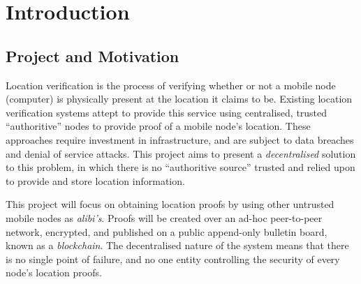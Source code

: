 \section{Introduction}
\subsection{Project and Motivation}
Location verification is the process of verifying whether or not a mobile node (computer) is physically present at the location it claims to be. Existing location verification systems attept to provide this service using centralised, trusted ``authoritive'' nodes to provide proof of a mobile node's location. These approaches require investment in infrastructure, and are subject to data breaches and denial of service attacks. This project aims to present a \textit{decentralised} solution to this problem, in which there is no ``authoritive source'' trusted and relied upon to provide and store location information.

This project will focus on obtaining location proofs by using other untrusted mobile nodes as \textit{alibi's}. Proofs will be created over an ad-hoc peer-to-peer network, encrypted, and published on a public append-only bulletin board, known as a \textit{blockchain}. The decentralised nature of the system means that there is no single point of failure, and no one entity controlling the security of every node's location proofs.